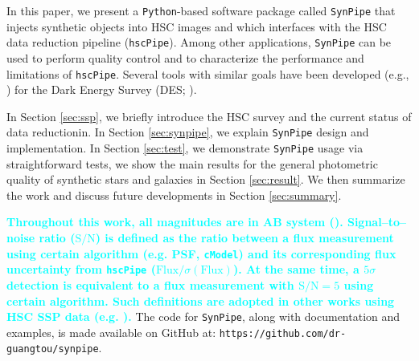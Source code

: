 \documentclass[useamsfonts]{pasj01}
\def\hscpipe{\texttt{hscPipe}}
\def\synpipe{\texttt{SynPipe}}
\def\cmodel{\texttt{cModel}}
\def\s2n{{$\mathrm{S}/\mathrm{N}$}}
\newcommand{\song}[1]{\textcolor{cyan} {\textbf{#1}}}
\begin{document}
    In this paper, we present a \texttt{Python}-based software package called 
    \synpipe{} that injects synthetic objects into HSC images and which interfaces with 
    the HSC data reduction pipeline (\hscpipe{}). 
    Among other applications, \synpipe{} can be used to perform quality control and 
    to characterize the performance and limitations of \hscpipe{}. 
    Several tools with similar goals have been developed (e.g., \citealt{Chang2015,
    Suchyta2016}) for the Dark Energy Survey (DES; \citealt{DES2005}).

    In Section \ref{sec:ssp}, we briefly introduce the HSC survey and the current status
    of data reductionin. 
    In Section \ref{sec:synpipe}, we explain \synpipe{} design and implementation.
    In Section \ref{sec:test}, we demonstrate \synpipe{} usage via straightforward
    tests, we show the main results for the general photometric quality of synthetic 
    stars and galaxies in Section \ref{sec:result}.
    We then summarize the work and discuss future developments in Section 
    \ref{sec:summary}.

    \song{
    Throughout this work, all magnitudes are in AB system (\citealt{Oke1974}). 
    Signal--to--noise ratio (\s2n{}) is defined as the ratio between a flux measurement 
    using certain algorithm (e.g. PSF, \cmodel{}) and its corresponding flux uncertainty 
    from \hscpipe{} ($\mathrm{Flux}/\sigma(\mathrm{Flux})$).  
    At the same time, a $5\sigma$ detection is equivalent to a flux measurement with 
    \s2n{}$=5$ using certain algorithm.  
    Such definitions are adopted in other works using HSC SSP data 
    (e.g. \citealt{Bosch2017, HSCDR1}).
    } 
    The code for \synpipe{}, along with documentation and examples, is made available
    on GitHub at: \texttt{https://github.com/dr-guangtou/synpipe}.
    
\end{document}
